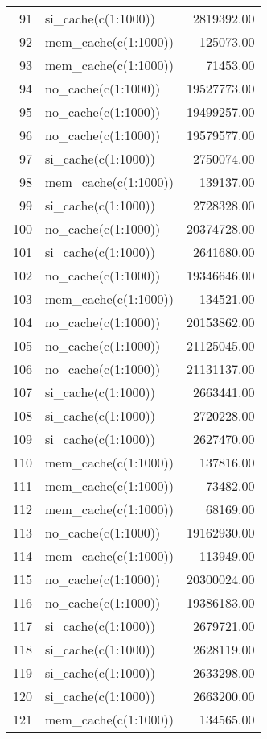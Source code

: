 \begin{table}[ht]
\begin{tabular}{rlr}
  91 & si\_cache(c(1:1000)) & 2819392.00 \\ 
  92 & mem\_cache(c(1:1000)) & 125073.00 \\ 
  93 & mem\_cache(c(1:1000)) & 71453.00 \\ 
  94 & no\_cache(c(1:1000)) & 19527773.00 \\ 
  95 & no\_cache(c(1:1000)) & 19499257.00 \\ 
  96 & no\_cache(c(1:1000)) & 19579577.00 \\ 
  97 & si\_cache(c(1:1000)) & 2750074.00 \\ 
  98 & mem\_cache(c(1:1000)) & 139137.00 \\ 
  99 & si\_cache(c(1:1000)) & 2728328.00 \\ 
  100 & no\_cache(c(1:1000)) & 20374728.00 \\ 
  101 & si\_cache(c(1:1000)) & 2641680.00 \\ 
  102 & no\_cache(c(1:1000)) & 19346646.00 \\ 
  103 & mem\_cache(c(1:1000)) & 134521.00 \\ 
  104 & no\_cache(c(1:1000)) & 20153862.00 \\ 
  105 & no\_cache(c(1:1000)) & 21125045.00 \\ 
  106 & no\_cache(c(1:1000)) & 21131137.00 \\ 
  107 & si\_cache(c(1:1000)) & 2663441.00 \\ 
  108 & si\_cache(c(1:1000)) & 2720228.00 \\ 
  109 & si\_cache(c(1:1000)) & 2627470.00 \\ 
  110 & mem\_cache(c(1:1000)) & 137816.00 \\ 
  111 & mem\_cache(c(1:1000)) & 73482.00 \\ 
  112 & mem\_cache(c(1:1000)) & 68169.00 \\ 
  113 & no\_cache(c(1:1000)) & 19162930.00 \\ 
  114 & mem\_cache(c(1:1000)) & 113949.00 \\ 
  115 & no\_cache(c(1:1000)) & 20300024.00 \\ 
  116 & no\_cache(c(1:1000)) & 19386183.00 \\ 
  117 & si\_cache(c(1:1000)) & 2679721.00 \\ 
  118 & si\_cache(c(1:1000)) & 2628119.00 \\ 
  119 & si\_cache(c(1:1000)) & 2633298.00 \\ 
  120 & si\_cache(c(1:1000)) & 2663200.00 \\ 
  121 & mem\_cache(c(1:1000)) & 134565.00 \\ 

\end{tabular}
\end{table}
